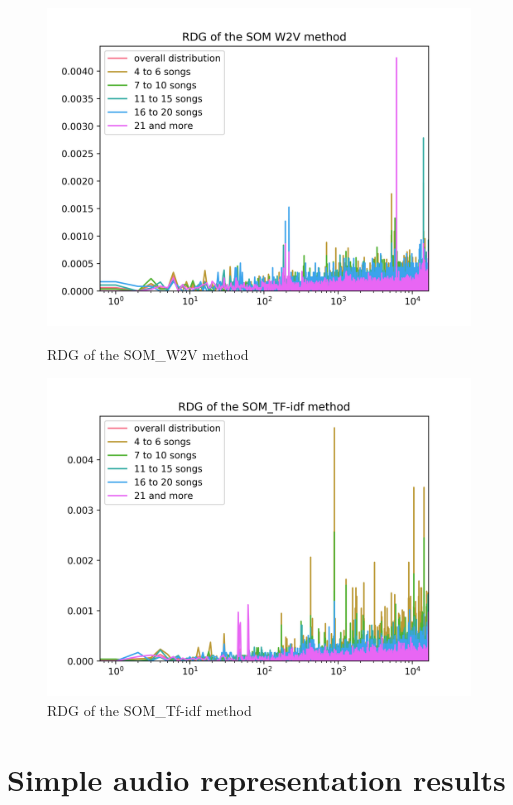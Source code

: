 \begin{figure}[h]
\centering
\begin{minipage}{.5\textwidth}
  \centering
  	\includegraphics[width=1\linewidth]{./img/som_w2v_graph.png}
	\caption{RDG of the SOM\_W2V method}
	\label{fig:som_distribution}
\end{minipage}%
\begin{minipage}{.5\textwidth}
  \centering
  \includegraphics[width=1\linewidth]{./img/som_tf_idf_graph.png}
  \caption{RDG of the SOM\_Tf-idf method}
  \label{fig:som_tf_idf_distribution}
\end{minipage}
\end{figure}

\section{Simple audio representation results}

